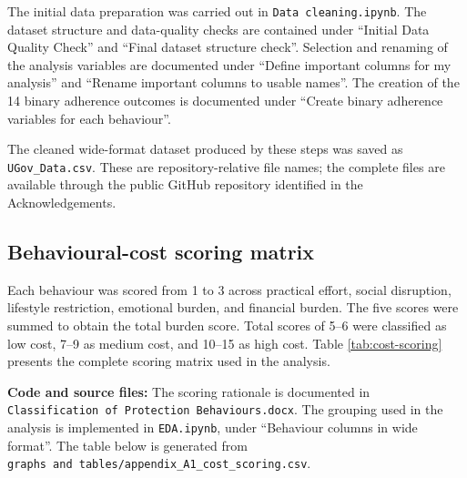 \documentclass[
  12pt,
  a4paper,
]{article}
\begin{document}
The initial data preparation was carried out in \texttt{Data\ cleaning.ipynb}.
The dataset structure and data-quality checks are contained under
``Initial Data Quality Check'' and ``Final dataset structure check''.
Selection and renaming of the analysis variables are documented under
``Define important columns for my analysis'' and ``Rename important columns
to usable names''. The creation of the 14 binary adherence outcomes is
documented under ``Create binary adherence variables for each behaviour''.

The cleaned wide-format dataset produced by these steps was saved as
\texttt{UGov\_Data.csv}. These are repository-relative file names; the complete
files are available through the public GitHub repository identified in
the Acknowledgements.

\small

\subsection{Behavioural-cost scoring matrix}\label{behavioural-cost-scoring-matrix}

Each behaviour was scored from 1 to 3 across practical effort, social
disruption, lifestyle restriction, emotional burden, and financial
burden. The five scores were summed to obtain the total burden score.
Total scores of 5--6 were classified as low cost, 7--9 as medium cost,
and 10--15 as high cost. Table \ref{tab:cost-scoring} presents the
complete scoring matrix used in the analysis.

\textbf{Code and source files:} The scoring rationale is documented in
\texttt{Classification\ of\ Protection\ Behaviours.docx}. The grouping used in the
analysis is implemented in \texttt{EDA.ipynb}, under ``Behaviour columns in wide
format''. The table below is generated from
\texttt{graphs\ and\ tables/appendix\_A1\_cost\_scoring.csv}.
\end{document}
